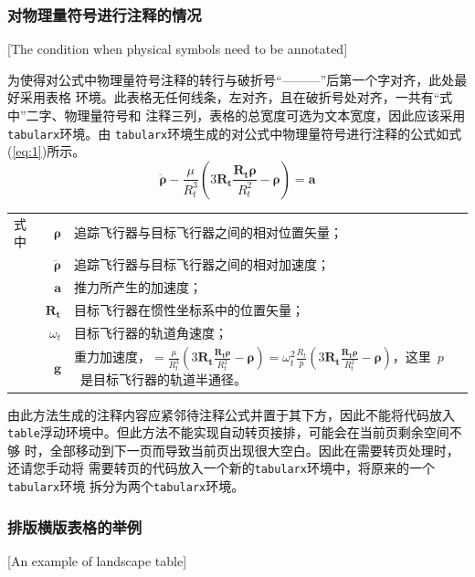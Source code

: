 \subsubsection{对物理量符号进行注释的情况}[The condition when physical symbols
  need to be annotated]

为使得对公式中物理量符号注释的转行与破折号“———”后第一个字对齐，此处最好采用表格
环境。此表格无任何线条，左对齐，且在破折号处对齐，一共有“式中”二字、物理量符号和
注释三列，表格的总宽度可选为文本宽度，因此应该采用\verb|tabularx|环境。由
\verb|tabularx|环境生成的对公式中物理量符号进行注释的公式如式(\ref{eq:1})所示。
\begin{equation}\label{eq:1}
  \ddot{\boldsymbol{\rho}}-\frac{\mu}{R_{t}^{3}}\left(3\mathbf{R_{t}}\frac{\mathbf{R_{t}\rho}}{R_{t}^{2}}-\boldsymbol{\rho}\right)=\mathbf{a}
\end{equation}
\begin{tabularx}{\textwidth}{@{}l@{\quad}r@{———}X@{}}
  式中 & $\boldsymbol{\rho}$        & 追踪飞行器与目标飞行器之间的相对位置矢量； \\
       & $\boldsymbol{\ddot{\rho}}$ & 追踪飞行器与目标飞行器之间的相对加速度；   \\
       & $\mathbf{a}$               & 推力所产生的加速度；                       \\
       & $\mathbf{R_t}$             & 目标飞行器在惯性坐标系中的位置矢量；       \\
       & $\omega_{t}$               & 目标飞行器的轨道角速度；                   \\
       & $\mathbf{g}$               & 重力加速度，$=\frac{\mu}{R_{t}^{3}}\left(
    3\mathbf{R_{t}}\frac{\mathbf{R_{t}\rho}}{R_{t}^{2}}-\boldsymbol{\rho}\right)=\omega_{t}^{2}\frac{R_{t}}{p}\left(
    3\mathbf{R_{t}}\frac{\mathbf{R_{t}\rho}}{R_{t}^{2}}-\boldsymbol{\rho}\right)$，这里~$p$~是目标飞行器的轨道半通径。
\end{tabularx}\vspace{3.15bp}
由此方法生成的注释内容应紧邻待注释公式并置于其下方，因此不能将代码放入
\verb|table|浮动环境中。但此方法不能实现自动转页接排，可能会在当前页剩余空间不够
时，全部移动到下一页而导致当前页出现很大空白。因此在需要转页处理时，还请您手动将
需要转页的代码放入一个新的\verb|tabularx|环境中，将原来的一个\verb|tabularx|环境
拆分为两个\verb|tabularx|环境。

\subsubsection{排版横版表格的举例}[An example of landscape table]

